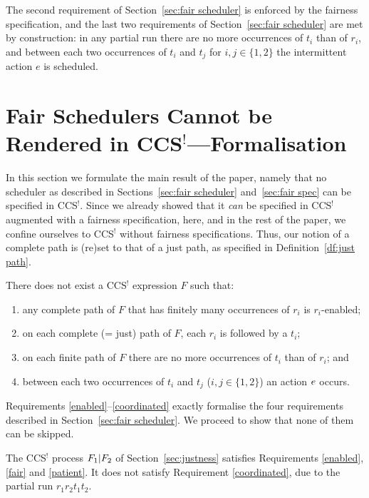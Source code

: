 \documentclass[smallcondensed]{svjour3}
\newcommand{\Def}[1]{Definition~\ref{df:#1}}
\newcommand{\Sect}[1]{Section~\ref{sec:#1}}
\newcounter {part}
\begin{document}
The second requirement of \Sect{fair scheduler} is enforced by the fairness specification,
and the last two requirements of \Sect{fair scheduler} are met by construction:
in any partial run there are no more occurrences of $t_i$ than of $r_i$,
and between each two occurrences of $t_i$ and $t_j$ for $i,j\in\{1,2\}$ the intermittent action $e$ is scheduled.

\section[Fair Schedulers Cannot be Rendered in CCS---Formalisation]
        {Fair Schedulers Cannot be Rendered in CCS$^!$---Formalisation}\label{sec:no fair scheduler}


In this section we formulate the main result of the paper, namely that no scheduler as described in
Sections~\ref{sec:fair scheduler} and~\ref{sec:fair spec} can be specified in CCS$^!$. Since we already showed that it \emph{can} be
specified in CCS$^!$ augmented with a fairness specification, here, and in the rest of the paper, we
confine ourselves to CCS$^!$ without fairness specifications. Thus, our notion of a
complete path is (re)set to that of a just path, as specified in \Def{just path}.

\begin{theorem}\rm\label{thm:no fair scheduler}
There does not exist a CCS$^!$ expression $F$ such that:
\vspace{-1ex}
\begin{enumerate}
\item any complete path of $F$ that has finitely many occurrences of $r_i$ is $r_i$-enabled;\label{enabled}
\item on each complete (= just) path of $F$, each $r_i$ is followed by a $t_i$;\label{fair}
\item on each finite path of $F$ there are no more occurrences of $t_i$ than of $r_i$;\label{patient} and
\item between each two occurrences of $t_i$ and $t_j$ ($i,j\in\{1,2\}$) an action $e$ occurs.\label{coordinated}
\end{enumerate}
\end{theorem}
Requirements \ref{enabled}--\ref{coordinated} exactly formalise the
four requirements described in \Sect{fair scheduler}. We proceed to show that none of them can be skipped.

The CCS$^!$ process $F_1|F_2$ of \Sect{justness}
satisfies Requirements \ref{enabled}, \ref{fair} and \ref{patient}.
It does not satisfy Requirement \ref{coordinated}, due to the partial run $r_1r_2t_1t_2$.
\vspace{2pt}
\end{document}
